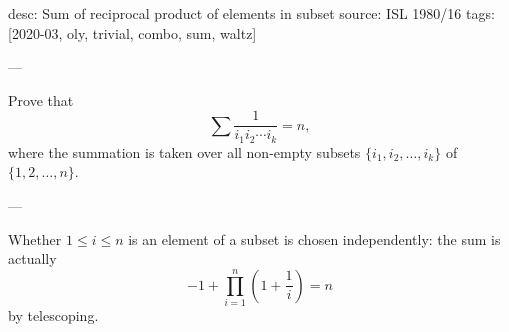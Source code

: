 desc: Sum of reciprocal product of elements in subset
source: ISL 1980/16
tags: [2020-03, oly, trivial, combo, sum, waltz]

---

Prove that \[\sum\frac1{i_1i_2\cdots i_k}=n,\]
where the summation is taken over all non-empty subsets $\{i_1,i_2,\ldots,i_k\}$ of $\{1,2,\ldots,n\}$.

---

Whether $1\le i\le n$ is an element of a subset is chosen independently: the sum is actually \[-1+\prod_{i=1}^n\left(1+\frac1i\right)=n\]
by telescoping.

